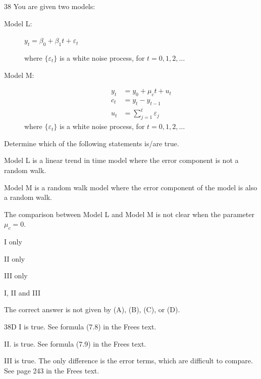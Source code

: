 \begin{question}{38}
You are given two models:

\begin{description}
\item[Model L:] $y_t = \beta_0 + \beta_1 t + \varepsilon_t$

where $\{\varepsilon_t\}$ is a white noise process, for $t = 0,1,2,\ldots$

\item[Model M:]
\begin{align*}
y_t &= y_0 + \mu_c t + u_t \\
c_t &= y_t - y_{t-1} \\
u_t &= \sum_{j=1}^{t} \varepsilon_j
\end{align*}
where $\{\varepsilon_t\}$ is a white noise process, for $t = 0,1,2,\ldots$
\end{description}

Determine which of the following statements is/are true.
\begin{statements}
\item Model L is a linear trend in time model where the error component is not a random walk.
\item Model M is a random walk model where the error component of the model is also a random walk.
\item The comparison between Model L and Model M is not clear when the parameter $\mu_c = 0$.
\end{statements}

\begin{choices}
\item I only
\item II only
\item III only
\item I, II and III
\item The correct answer is not given by (A), (B), (C), or (D).
\end{choices}
\end{question}
\begin{solution}{38}{D}
I is true. See formula (7.8) in the Frees text.

II. is true. See formula (7.9) in the Frees text.

III is true. The only difference is the error terms, which are difficult to compare. See page 243 in the Frees text.
\end{solution}

